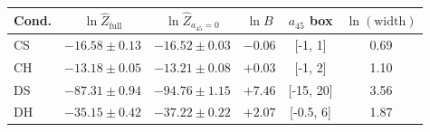 \begin{tabular}{lccccc}\toprule
Cond. & $\ln\hat Z_{\mathrm{full}}$ & $\ln\hat Z_{a_{45}=0}$ & $\ln B$ & $a_{45}$ box & $\ln(\text{width})$\\
\midrule
CS & $-16.58 \pm 0.13$ & $-16.52 \pm 0.03$ & $-0.06$ & [-1, 1] & 0.69\\
CH & $-13.18 \pm 0.05$ & $-13.21 \pm 0.08$ & $+0.03$ & [-1, 2] & 1.10\\
DS & $-87.31 \pm 0.94$ & $-94.76 \pm 1.15$ & $+7.46$ & [-15, 20] & 3.56\\
DH & $-35.15 \pm 0.42$ & $-37.22 \pm 0.22$ & $+2.07$ & [-0.5, 6] & 1.87\\
\bottomrule\end{tabular}
